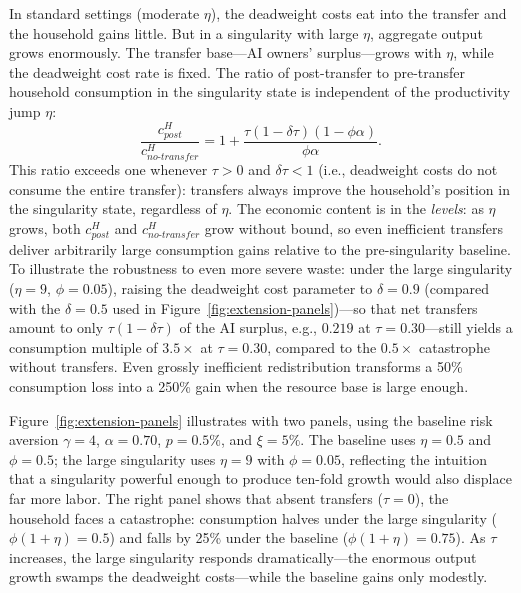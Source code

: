 \documentclass[12pt]{article}
\begin{document}
In standard settings (moderate $\eta$), the deadweight costs eat into the transfer and the household gains little. But in a singularity with large $\eta$, aggregate output grows enormously. The transfer base---AI owners' surplus---grows with $\eta$, while the deadweight cost rate is fixed. The ratio of post-transfer to pre-transfer household consumption in the singularity state is independent of the productivity jump $\eta$:
%
\begin{equation}
\frac{c^H_{post}}{c^H_{no\text{-}transfer}} = 1 + \frac{\tau(1 - \delta \tau)(1 - \phi\alpha)}{\phi\alpha}. \label{eq:transfer-ratio}
\end{equation}
%
This ratio exceeds one whenever $\tau > 0$ and $\delta\tau < 1$ (i.e., deadweight costs do not consume the entire transfer): transfers always improve the household's position in the singularity state, regardless of $\eta$. The economic content is in the \emph{levels}: as $\eta$ grows, both $c^H_{post}$ and $c^H_{no\text{-}transfer}$ grow without bound, so even inefficient transfers deliver arbitrarily large consumption gains relative to the pre-singularity baseline. To illustrate the robustness to even more severe waste: under the large singularity ($\eta = 9$, $\phi = 0.05$), raising the deadweight cost parameter to $\delta = 0.9$ (compared with the $\delta = 0.5$ used in Figure~\ref{fig:extension-panels})---so that net transfers amount to only $\tau(1 - \delta\tau)$ of the AI surplus, e.g., $0.219$ at $\tau = 0.30$---still yields a consumption multiple of $3.5\times$ at $\tau = 0.30$, compared to the $0.5\times$ catastrophe without transfers. Even grossly inefficient redistribution transforms a 50\% consumption loss into a 250\% gain when the resource base is large enough.

Figure~\ref{fig:extension-panels} illustrates with two panels, using the baseline risk aversion $\gamma = 4$, $\alpha = 0.70$, $p = 0.5\%$, and $\xi = 5\%$. The baseline uses $\eta = 0.5$ and $\phi = 0.5$; the large singularity uses $\eta = 9$ with $\phi = 0.05$, reflecting the intuition that a singularity powerful enough to produce ten-fold growth would also displace far more labor. The right panel shows that absent transfers ($\tau = 0$), the household faces a catastrophe: consumption halves under the large singularity ($\phi(1+\eta) = 0.5$) and falls by 25\% under the baseline ($\phi(1+\eta) = 0.75$). As $\tau$ increases, the large singularity responds dramatically---the enormous output growth swamps the deadweight costs---while the baseline gains only modestly.
\end{document}
